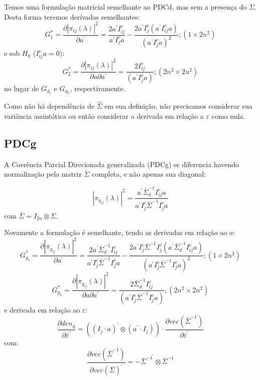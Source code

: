\documentclass[a4paper,10pt]{article}
\begin{document}
Temos uma formulação matricial semelhante ao PDCd, mas sem a presença do $\Sigma$. Desta forma teremos derivadas semelhantes:
\begin{equation}
G_{1}^{\ast} = \frac{\partial |\pi_{ij}(\lambda)|^{2}}{\partial a^{'}} = \frac{2 a^{'} I_{ij}^{c}} {a^{'} I_{j}^{c} a} - \frac{2 a^{'} I_{j}^{c} (a^{'} I_{ij}^{c} a)} {(a^{'} I_{j}^{c} a)^{2}}; (1 \times 2n^{2})
\end{equation}
e sob $H_0$ ($I_{ij}^{c} a = 0$):
\begin{equation}
G_{2}^{\ast} = \frac{\partial |\pi_{ij}(\lambda)|^{2}}{\partial a \partial a^{'}} = \frac{2 I_{ij}^{c}}{(a^{'} I_{j}^{c} a)}; (2n^{2} \times 2n^{2})
\end{equation}
no lugar de $G_{d_1}$ e $G_{d_2}$, respectivamente.

Como não há dependência de $\hat{\Sigma}$ em sua definição, não precisamos considerar sua variância assintótica ou então considerar a derivada em relação a $\varepsilon$ como nula.

\subsection{PDCg}

A Coerência Parcial Direcionada generalizada (PDCg) se diferencia havendo normalização pela matriz $\Sigma$ completa, e não apenas sua diagonal:

\begin{equation}
 |\pi_{g_{ij}}(\lambda)|^{2}  = \frac{a^{'} \bar{\Sigma}_{d}^{-1} I_{ij}^{c} a}{a^{'} I_{j}^{c} \bar{\Sigma}^{-1} I_{j}^{c} a}
\end{equation}
com $\bar{\Sigma} = I_{2n} \otimes \Sigma$.

Novamente a formulação é semelhante, tendo as derivadas em relação ao $a$:
\begin{equation}
G_{g_1}^{\ast} = \frac{\partial |\pi_{g_{ij}}(\lambda)|^{2}}{\partial a^{'}} = \frac{2 a^{'} \bar{\Sigma}_{d}^{-1} I_{ij}^{c}} {a^{'} I_{j}^{c} \bar{\Sigma}^{-1} I_{j}^{c} a} - \frac{2 a^{'} I_{j}^{c} \bar{\Sigma}^{-1} I_{j}^{c} (a^{'} \bar{\Sigma}_{d}^{-1} I_{ij}^{c} a)} {(a^{'} I_{j}^{c} \bar{\Sigma}^{-1} I_{j}^{c} a)^{2}}; (1 \times 2n^{2})
\end{equation}
\begin{equation}
G_{g_2}^{\ast} = \frac{\partial |\pi_{g_{ij}}(\lambda)|^{2}}{\partial a \partial a^{'}} = \frac{2 \bar{\Sigma}_{d}^{-1} I_{ij}^{c}}{(a^{'} I_{j}^{c} \bar{\Sigma}^{-1} I_{j}^{c} a)}; (2n^{2} \times 2n^{2})
\end{equation}
e derivada em relação ao $\varepsilon$:
\begin{equation}
\frac{\partial den_{g}}{\partial \bar{\varepsilon}^{'}} = ((I_{j} \cdot a)^{'} \otimes (a^{'} \cdot I_{j})) \cdot \frac{\partial vec(\bar{\Sigma}^{-1})}{\partial \bar{\varepsilon}^{'}}
\end{equation}
com:
\begin{equation}
\frac{\partial vec(\bar{\Sigma}^{-1})}{\partial vec(\bar{\Sigma})^{'}} = -\bar{\Sigma}^{-1^{'}} \otimes \bar{\Sigma}^{-1}
\end{equation}
\end{document}
